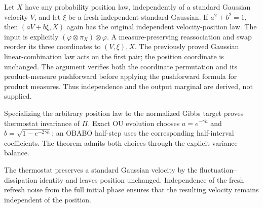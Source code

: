 \documentclass[11pt,a4paper]{article}
\begin{document}
Let \(X\) have any probability position law, independently of a standard Gaussian velocity \(V\), and let \(\xi\) be a fresh independent standard Gaussian. If \(a^2+b^2=1\), then \((aV+b\xi,X)\) again has the original independent velocity-position law. The input is explicitly \((\varphi\otimes\pi_X)\otimes\varphi\). A measure-preserving reassociation and swap reorder its three coordinates to \((V,\xi),X\). The previously proved Gaussian linear-combination law acts on the first pair; the position coordinate is unchanged. The argument verifies both the coordinate permutation and its product-measure pushforward before applying the pushforward formula for product measures. Thus independence and the output marginal are derived, not supplied.



Specializing the arbitrary position law to the normalized Gibbs target proves thermostat invariance of \(\Pi\). Exact OU evolution chooses \(a=e^{-\gamma h}\) and \(b=\sqrt{1-e^{-2\gamma h}}\); an OBABO half-step uses the corresponding half-interval coefficients. The theorem admits both choices through the explicit variance balance.



The thermostat preserves a standard Gaussian velocity by the fluctuation–dissipation identity and leaves position unchanged. Independence of the fresh refresh noise from the full initial phase ensures that the resulting velocity remains independent of the position.
\end{document}
